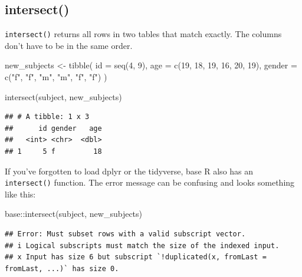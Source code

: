 \documentclass[
  oneside]{book}
\newenvironment{Shaded}{\begin{snugshade}}{\end{snugshade}}
\newcommand{\AttributeTok}[1]{\textcolor[rgb]{0.77,0.63,0.00}{#1}}
\newcommand{\DecValTok}[1]{\textcolor[rgb]{0.00,0.00,0.81}{#1}}
\newcommand{\FunctionTok}[1]{\textcolor[rgb]{0.00,0.00,0.00}{#1}}
\newcommand{\NormalTok}[1]{#1}
\newcommand{\OtherTok}[1]{\textcolor[rgb]{0.56,0.35,0.01}{#1}}
\newcommand{\SpecialCharTok}[1]{\textcolor[rgb]{0.00,0.00,0.00}{#1}}
\newcommand{\StringTok}[1]{\textcolor[rgb]{0.31,0.60,0.02}{#1}}
\begin{document}
\hypertarget{intersect}{%
\subsection{intersect()}\label{intersect}}

\texttt{intersect()} returns all rows in two tables that match exactly. The columns don't have to be in the same order.

\begin{Shaded}
\begin{Highlighting}[]
\NormalTok{new\_subjects }\OtherTok{\textless{}{-}} \FunctionTok{tibble}\NormalTok{(}
  \AttributeTok{id =} \FunctionTok{seq}\NormalTok{(}\DecValTok{4}\NormalTok{, }\DecValTok{9}\NormalTok{),}
  \AttributeTok{age =} \FunctionTok{c}\NormalTok{(}\DecValTok{19}\NormalTok{, }\DecValTok{18}\NormalTok{, }\DecValTok{19}\NormalTok{, }\DecValTok{16}\NormalTok{, }\DecValTok{20}\NormalTok{, }\DecValTok{19}\NormalTok{),}
  \AttributeTok{gender =} \FunctionTok{c}\NormalTok{(}\StringTok{"f"}\NormalTok{, }\StringTok{"f"}\NormalTok{, }\StringTok{"m"}\NormalTok{, }\StringTok{"m"}\NormalTok{, }\StringTok{"f"}\NormalTok{, }\StringTok{"f"}\NormalTok{)}
\NormalTok{)}

\FunctionTok{intersect}\NormalTok{(subject, new\_subjects)}
\end{Highlighting}
\end{Shaded}

\begin{verbatim}
## # A tibble: 1 x 3
##      id gender   age
##   <int> <chr>  <dbl>
## 1     5 f         18
\end{verbatim}

\begin{warning}

If you've forgotten to load dplyr or the tidyverse, base R also has an \texttt{intersect()} function. The error message can be confusing and looks something like this:

\begin{Shaded}
\begin{Highlighting}[]
\NormalTok{base}\SpecialCharTok{::}\FunctionTok{intersect}\NormalTok{(subject, new\_subjects)}
\end{Highlighting}
\end{Shaded}

\begin{verbatim}
## Error: Must subset rows with a valid subscript vector.
## i Logical subscripts must match the size of the indexed input.
## x Input has size 6 but subscript `!duplicated(x, fromLast = fromLast, ...)` has size 0.
\end{verbatim}

\end{warning}
\end{document}
